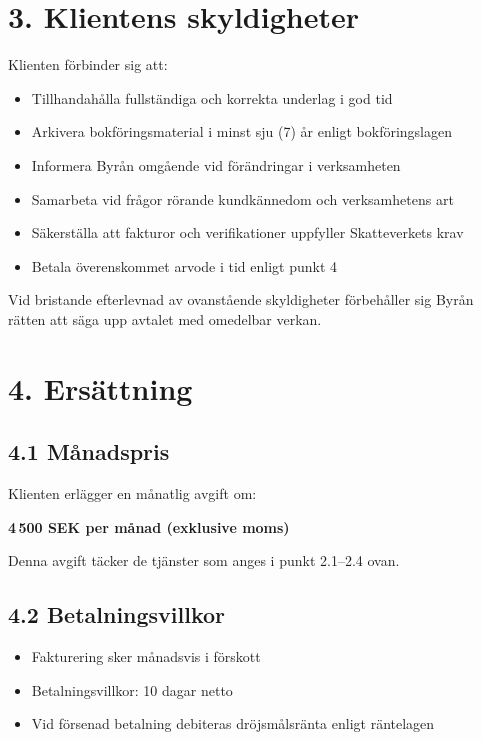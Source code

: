 \documentclass[a4paper,11pt]{article}
\begin{document}
\section*{3. Klientens skyldigheter}

Klienten förbinder sig att:

\begin{itemize}
  \item Tillhandahålla fullständiga och korrekta underlag i god tid
  \item Arkivera bokföringsmaterial i minst sju (7) år enligt bokföringslagen
  \item Informera Byrån omgående vid förändringar i verksamheten
  \item Samarbeta vid frågor rörande kundkännedom och verksamhetens art
  \item Säkerställa att fakturor och verifikationer uppfyller Skatteverkets krav
  \item Betala överenskommet arvode i tid enligt punkt 4
\end{itemize}

Vid bristande efterlevnad av ovanstående skyldigheter förbehåller sig Byrån rätten att säga upp avtalet med omedelbar verkan.

\section*{4. Ersättning}

\subsection*{4.1 Månadspris}
Klienten erlägger en månatlig avgift om:

\begin{center}
  \Large \textbf{4\,500 SEK per månad (exklusive moms)}
\end{center}

Denna avgift täcker de tjänster som anges i punkt 2.1--2.4 ovan.

\subsection*{4.2 Betalningsvillkor}
\begin{itemize}
  \item Fakturering sker månadsvis i förskott
  \item Betalningsvillkor: 10 dagar netto
  \item Vid försenad betalning debiteras dröjsmålsränta enligt räntelagen
\end{itemize}
\end{document}
